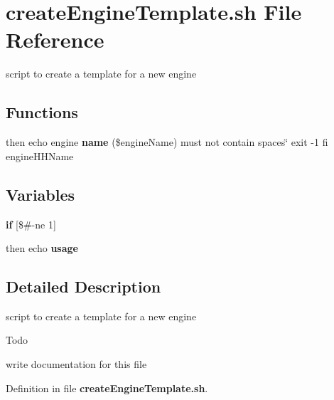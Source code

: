 \section{create\-Engine\-Template.\-sh File Reference}
\label{createEngineTemplate_8sh}


script to create a template for a new engine  


\subsection*{Functions}
\begin{DoxyCompactItemize}
\item 
then echo engine {\bfseries name} (\$engine\-Name) must not contain spaces\char`\"{} exit -\/1 fi engine\-H\-H\-Name\label{createEngineTemplate_8sh_a5a13007562eecc12703ec99e1212bc05}

\end{DoxyCompactItemize}
\subsection*{Variables}
\begin{DoxyCompactItemize}
\item 
{\bfseries if} [\$\#-\/ne 1]\label{createEngineTemplate_8sh_a3f3b2b6935f2fc470578298e835e68e5}

\item 
then echo {\bfseries usage}\label{createEngineTemplate_8sh_a6636ca61e090d70e554fa8dfba6e5a50}

\end{DoxyCompactItemize}


\subsection{Detailed Description}
script to create a template for a new engine \begin{DoxyRefDesc}{Todo}
\item[{\bf Todo}]write documentation for this file \end{DoxyRefDesc}


Definition in file {\bf create\-Engine\-Template.\-sh}.

